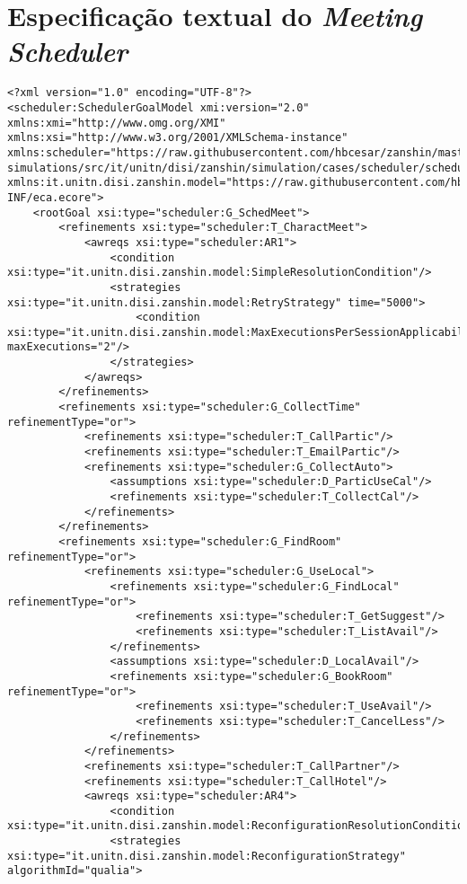 \chapter{Especificação textual do \textit{Meeting Scheduler}}

\begin{lstlisting}[caption={Especifcação do Sistema Meeting Scheduler}]
<?xml version="1.0" encoding="UTF-8"?>
<scheduler:SchedulerGoalModel xmi:version="2.0" xmlns:xmi="http://www.omg.org/XMI" xmlns:xsi="http://www.w3.org/2001/XMLSchema-instance" xmlns:scheduler="https://raw.githubusercontent.com/hbcesar/zanshin/master/zanshin-simulations/src/it/unitn/disi/zanshin/simulation/cases/scheduler/scheduler.ecore" xmlns:it.unitn.disi.zanshin.model="https://raw.githubusercontent.com/hbcesar/zanshin/master/it.unitn.disi.zanshin.core/META-INF/eca.ecore">
	<rootGoal xsi:type="scheduler:G_SchedMeet">
		<refinements xsi:type="scheduler:T_CharactMeet">
			<awreqs xsi:type="scheduler:AR1">
				<condition xsi:type="it.unitn.disi.zanshin.model:SimpleResolutionCondition"/>
				<strategies xsi:type="it.unitn.disi.zanshin.model:RetryStrategy" time="5000">
					<condition xsi:type="it.unitn.disi.zanshin.model:MaxExecutionsPerSessionApplicabilityCondition" maxExecutions="2"/>
				</strategies>
			</awreqs>
		</refinements>
		<refinements xsi:type="scheduler:G_CollectTime" refinementType="or">
			<refinements xsi:type="scheduler:T_CallPartic"/>
			<refinements xsi:type="scheduler:T_EmailPartic"/>
			<refinements xsi:type="scheduler:G_CollectAuto">
				<assumptions xsi:type="scheduler:D_ParticUseCal"/>
				<refinements xsi:type="scheduler:T_CollectCal"/>
			</refinements>
		</refinements>
		<refinements xsi:type="scheduler:G_FindRoom" refinementType="or">
			<refinements xsi:type="scheduler:G_UseLocal">
				<refinements xsi:type="scheduler:G_FindLocal" refinementType="or">
					<refinements xsi:type="scheduler:T_GetSuggest"/>
					<refinements xsi:type="scheduler:T_ListAvail"/>
				</refinements>
				<assumptions xsi:type="scheduler:D_LocalAvail"/>
				<refinements xsi:type="scheduler:G_BookRoom" refinementType="or">
					<refinements xsi:type="scheduler:T_UseAvail"/>
					<refinements xsi:type="scheduler:T_CancelLess"/>
				</refinements>
			</refinements>
			<refinements xsi:type="scheduler:T_CallPartner"/>
			<refinements xsi:type="scheduler:T_CallHotel"/>
			<awreqs xsi:type="scheduler:AR4">
				<condition xsi:type="it.unitn.disi.zanshin.model:ReconfigurationResolutionCondition"/>
				<strategies xsi:type="it.unitn.disi.zanshin.model:ReconfigurationStrategy" algorithmId="qualia">

\end{lstlisting}
